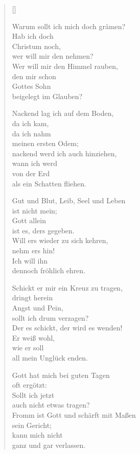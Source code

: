 \begin{multicols}{2}
\settowidth{\versewidth}{Gut und Blut, Leib, Seel und Leben}
\begin{verse}[\versewidth]

 Warum sollt ich mich doch grämen?\\
Hab ich doch\\
Christum noch,\\
wer will mir den nehmen?\\
Wer will mir den Himmel rauben,\\
den mir schon\\
Gottes Sohn\\
beigelegt im Glauben?

 Nackend lag ich auf dem Boden,\\
da ich kam,\\
da ich nahm\\
meinen ersten Odem;\\
nackend werd ich auch hinziehen,\\
wann ich werd\\
von der Erd\\
als ein Schatten fliehen.

 Gut und Blut, Leib, Seel und Leben\\
ist nicht mein;\\
Gott allein\\
ist es, ders gegeben.\\
Will ers wieder zu sich kehren,\\
nehm ers hin!\\
Ich will ihn\\
dennoch fröhlich ehren.

 Schickt er mir ein Kreuz zu tragen,\\
dringt herein\\
Angst und Pein,\\
sollt ich drum verzagen?\\
Der es schickt, der wird es wenden!\\
Er weiß wohl,\\
wie er soll\\
all mein Unglück enden.

 Gott hat mich bei guten Tagen\\
oft ergötzt:\\
Sollt ich jetzt\\
auch nicht etwas tragen?\\
Fromm ist Gott und schärft mit Maßen\\
sein Gericht;\\
kann mich nicht\\
ganz und gar verlassen.


\end{verse}
\end{multicols}
